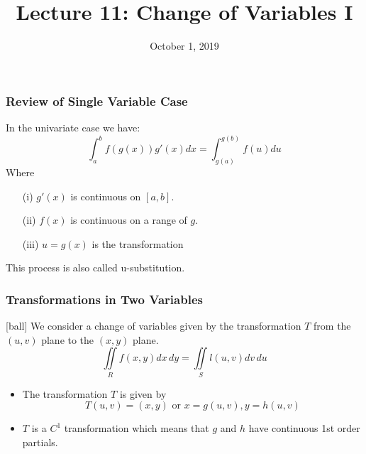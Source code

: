 \documentclass{beamer}
\title{\textbf{Lecture 11: Change of Variables I}}
\date{October 1, 2019}
\begin{document}
	
\frame{\titlepage}


\begin{frame}
\frametitle{Review of Single Variable Case}
In the univariate case we have:
$$\int_a^b f(g(x))g'(x)dx = \int_{g(a)}^{g(b)} f(u) du$$
Where
\begin{itemize}
	\item[(i)] $g'(x)$ is continuous on $[a,b]$.
	\item[(ii)] $f(x)$ is continuous on a range of $g$.
	\item[(iii)] $u=g(x)$ is the transformation
\end{itemize}
This process is also called u-substitution.\\
\end{frame}

%	
%


\begin{frame}
\frametitle{Transformations in Two Variables}
[ball]
We consider a change of variables given by the transformation $T$ from the $(u,v)$ plane to the $(x,y)$ plane.
$$\iint\limits_R f(x,y) dx\,dy = \iint\limits_S l(u,v)dv\,du$$

\begin{itemize}

	\item The transformation $T$ is given by $$T(u,v) = (x,y) \mbox{ or } x=g(u,v), y=h(u,v)$$
	\item $T$ is a $C^1$ transformation which means that $g$ and $h$ have continuous 1st order partials.
\end{itemize}
\end{frame}
\end{document}
